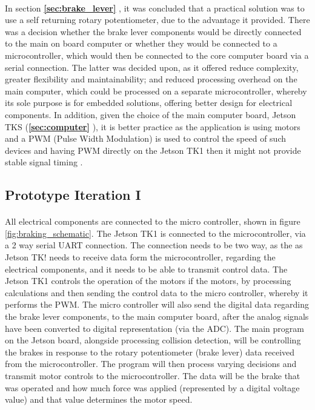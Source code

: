 \documentclass[a4paper]{report}
\begin{document}
\paragraph{}In section \textbf{\ref{sec:brake_lever} }, it was concluded that a practical solution was to use a self returning rotary potentiometer, due to the advantage it provided. There was a decision whether the brake lever components would be directly connected to the main on board computer or whether they would be connected to a microcontroller, which would then be connected to the core computer board via a serial connection. The latter was decided upon, as it offered reduce complexity, greater flexibility and maintainability; and reduced processing overhead on the main computer, which could be processed on a separate microcontroller, whereby its sole purpose is for embedded solutions, offering better design for electrical components. In addition, given the choice of the main computer board, Jetson TKS (\textbf{\ref{sec:computer} }), it is better practice as the application is using motors and a PWM (Pulse Width Modulation) is used to control the speed of such devices and having PWM directly on the Jetson TK1 then it might not provide stable signal timing \cite{jetson_microcontroller_support}.

\subsection{Prototype Iteration I}
\paragraph{}All electrical components are connected to the micro controller, shown in figure \ref{fig:braking_schematic}. The Jetson TK1 is connected to the microcontroller, via a 2 way serial UART connection. The connection needs to be two way, as the as Jetson TK! needs to receive data form the microcontroller, regarding the electrical components, and it needs to be able to transmit control data. The Jetson TK1 controls the operation of the motors if the motors, by processing calculations and then sending the control data to the micro controller, whereby it performs the PWM. The micro controller will also send the digital data regarding the brake lever components, to the main computer board, after the analog signals have been converted to digital representation (via the ADC). The main program on the Jetson board, alongside processing collision detection, will be controlling the brakes in response to the rotary potentiometer (brake lever) data received from the microcontroller. The program will then process varying decisions and transmit motor controls to the microcontroller. The data will be the brake that was operated and how much force was applied (represented by a digital voltage value) and that value determines the motor speed.
\end{document}
